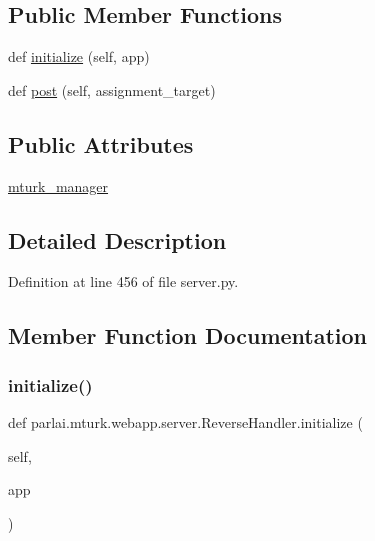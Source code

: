 \subsection*{Public Member Functions}
\begin{DoxyCompactItemize}
\item 
def \hyperlink{classparlai_1_1mturk_1_1webapp_1_1server_1_1ReverseHandler_a84a97cad4ff974d2765f02610941016c}{initialize} (self, app)
\item 
def \hyperlink{classparlai_1_1mturk_1_1webapp_1_1server_1_1ReverseHandler_a68457ba85cc4853cd5e1be1cbc05ca22}{post} (self, assignment\+\_\+target)
\end{DoxyCompactItemize}
\subsection*{Public Attributes}
\begin{DoxyCompactItemize}
\item 
\hyperlink{classparlai_1_1mturk_1_1webapp_1_1server_1_1ReverseHandler_a60664e4d71da9169afe68bd7b4f8a801}{mturk\+\_\+manager}
\end{DoxyCompactItemize}


\subsection{Detailed Description}


Definition at line 456 of file server.\+py.



\subsection{Member Function Documentation}
\mbox{\label{classparlai_1_1mturk_1_1webapp_1_1server_1_1ReverseHandler_a84a97cad4ff974d2765f02610941016c}} 
\subsubsection{\texorpdfstring{initialize()}{initialize()}}
{\footnotesize\ttfamily def parlai.\+mturk.\+webapp.\+server.\+Reverse\+Handler.\+initialize (\begin{DoxyParamCaption}\item[{}]{self,  }\item[{}]{app }\end{DoxyParamCaption})}



